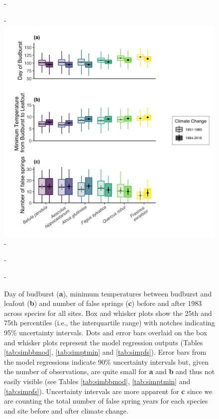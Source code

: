 \documentclass{article}\usepackage[]{graphicx}\usepackage[]{color}
\begin{document}
{\begin{figure} [H]
  -\begin{center}
  -\includegraphics[width=14cm]{..//..//analyses/figures/Boxplot_BBTminFS_noDots_modestslong.png}
  -\caption{Day of budburst (\textbf{a}), minimum temperatures between budburst and leafout (\textbf{b}) and number of false springs (\textbf{c}) before and after 1983 across species for all sites. Box and whisker plots show the 25th and 75th percentiles (i.e., the interquartile range) with notches indicating 95\% uncertainty intervals. Dots and error bars overlaid on the box and whisker plots represent the model regression outputs (Tables \ref{tab:simbbmod}, \ref{tab:simptmin} and \ref{tab:simpfs}). Error bars from the model regressions indicate 90\% uncertainty intervals but, given the number of observations, are quite small for \textbf{a} and \textbf{b} and thus not easily visible (see Tables \ref{tab:simbbmod}, \ref{tab:simptmin} and \ref{tab:simpfs}). Uncertainty intervals are more apparent for \textbf{c} since we are counting the total number of false spring years for each species and site before and after climate change.  }\label{fig:boxfs}
  -\end{center}
  -\end{figure}}
\end{document}
